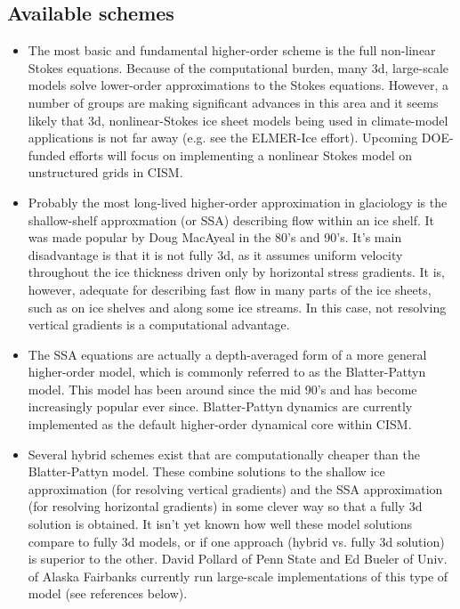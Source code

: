 \subsection{Available schemes}

\begin{itemize}
\item The most basic and fundamental higher-order scheme is the full non-linear Stokes equations. Because of the computational burden, many 3d, large-scale models solve lower-order approximations to the Stokes equations. However, a number of groups are making significant advances in this area and it seems likely that 3d, nonlinear-Stokes ice sheet models being used in climate-model applications is not far away (e.g. see the ELMER-Ice effort). Upcoming DOE-funded efforts will focus on implementing a nonlinear Stokes model on unstructured grids in CISM.
\end{itemize}

\begin{itemize}
\item Probably the most long-lived higher-order approximation in glaciology is the shallow-shelf approxmation (or SSA) describing flow within an ice shelf. It was made popular by Doug MacAyeal in the 80's and 90's. It's main disadvantage is that it is not fully 3d, as it assumes uniform velocity throughout the ice thickness driven only by horizontal stress gradients. It is, however, adequate for describing fast flow in many parts of the ice sheets, such as on ice shelves and along some ice streams. In this case, not resolving vertical gradients is a computational advantage.   
\end{itemize}

\begin{itemize}
\item The SSA equations are actually a depth-averaged form of a more general higher-order model, which is commonly referred to as the Blatter-Pattyn model. This model has been around since the mid 90's and has become increasingly popular ever since. Blatter-Pattyn dynamics are currently implemented as the default higher-order dynamical core within CISM. 
\end{itemize}

\begin{itemize}
\item Several hybrid schemes exist that are computationally cheaper than the Blatter-Pattyn model. These combine solutions to the shallow ice approximation (for resolving vertical gradients) and the SSA approximation (for resolving horizontal gradients) in some clever way so that a fully 3d solution is obtained. It isn't yet known how well these model solutions compare to fully 3d models, or if one approach (hybrid vs. fully 3d solution) is superior to the other. David Pollard of Penn State and Ed Bueler of Univ. of Alaska Fairbanks currently run large-scale implementations of this type of model (see references below).
\end{itemize}

